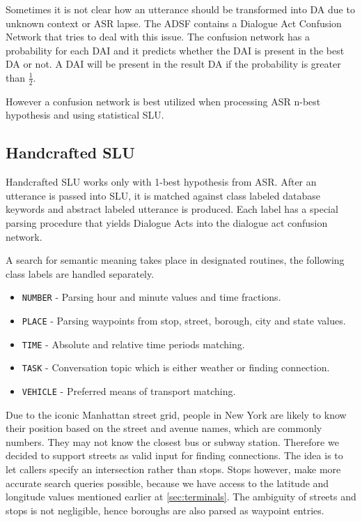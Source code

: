 Sometimes it is not clear how an utterance should be transformed into DA due to unknown context or ASR lapse.
The ADSF contains a Dialogue Act Confusion Network that tries to deal with this issue.
The confusion network has a probability for each DAI and it predicts whether the DAI is present in the best DA or not. %
A DAI will be present in the result DA if the probability is greater than \( \frac{1}{2} \).

However a confusion network is best utilized when processing ASR n-best hypothesis and using statistical SLU.

\subsection{Handcrafted SLU}

Handcrafted SLU works only with 1-best hypothesis from ASR.
After an utterance is passed into SLU, it is matched against class labeled database keywords and abstract labeled utterance is produced.
Each label has a special parsing procedure that yields Dialogue Acts into the dialogue act confusion network.

A search for semantic meaning takes place in designated routines, the following class labels are handled separately.

\begin{itemize}
	\item \texttt{NUMBER} - Parsing hour and minute values and time fractions.
	\item \texttt{PLACE} - Parsing waypoints from stop, street, borough, city and state values.
	\item \texttt{TIME} - Absolute and relative time periods matching.
	\item \texttt{TASK} - Conversation topic  which is either weather or finding connection.
	\item \texttt{VEHICLE} - Preferred means of transport matching.
\end{itemize}

Due to the iconic Manhattan street grid, people in New York are likely to know their position based on the street and avenue names, which are commonly numbers.
They may not know the closest bus or subway station.
Therefore we decided to support streets as valid input for finding connections.
The idea is to let callers specify an intersection rather than stops. Stops however, make more accurate search queries possible, because we have access to the latitude and longitude values mentioned earlier at \ref{sec:terminals}.
The ambiguity of streets and stops is not negligible, hence boroughs are also parsed as waypoint entries.

